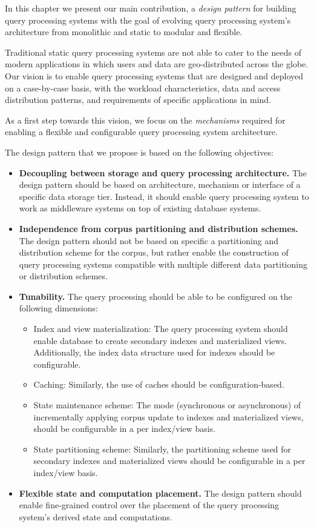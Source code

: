 
In this chapter we present our main contribution,
a \textit{design pattern} for building query processing systems with the goal of evolving query processing
system's architecture from monolithic and static to modular and flexible.

Traditional static query processing systems are not able to cater to the needs of modern applications in which users and
data are geo-distributed across the globe.
Our vision is to enable query processing systems that are designed and deployed on a case-by-case basis,
with the workload characteristics, data and access distribution patterns, and requirements of specific applications in
mind.

As a first step towards this vision, we focus on the \textit{mechanisms} required for enabling a flexible and configurable
query processing system architecture.

The design pattern that we propose is based on the following objectives:
\begin{itemize}
  \item \textbf{Decoupling between storage and query processing architecture.}
  The design pattern should be based on architecture, mechanism or interface of a specific data storage tier.
  Instead, it should enable query processing system to work as middleware systems on top of existing database systems.

  \item \textbf{Independence from corpus partitioning and distribution schemes.}
  The design pattern should not be based on specific a partitioning and distribution scheme for the corpus,
  but rather enable the construction of query processing systems compatible with multiple different
  data partitioning or distribution schemes.

  \item \textbf{Tunability.}
  The query processing should be able to be configured on the following dimensions:
  \begin{itemize}
    \item Index and view materialization:
    The query processing system should enable database to create secondary indexes and materialized views.
    Additionally, the index data structure used for indexes should be configurable.
    \item Caching:
    Similarly, the use of caches should be configuration-based.
    \item State maintenance scheme:
    The mode (synchronous or asynchronous) of incrementally applying corpus update to indexes and materialized views,
    should be configurable in a per index/view basis.
    \item State partitioning scheme:
    Similarly, the partitioning scheme used for secondary indexes and materialized views should be configurable in a per
    index/view basis.
  \end{itemize}

  \item \textbf{Flexible state and computation placement.}
  The design pattern should enable fine-grained control over the placement of the query processing system's derived state
  and computations.

\end{itemize}

